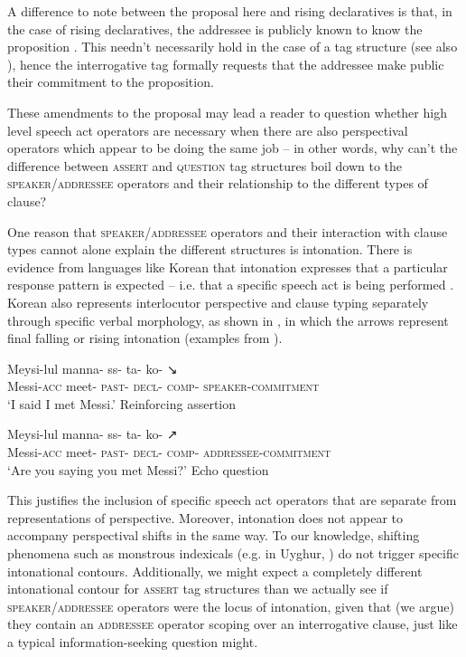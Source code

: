 \documentclass[output=paper,colorlinks,citecolor=brown]{langscibook}
\begin{document}
A difference to note between the proposal here and rising declaratives is that, in the case of rising declaratives, the addressee is publicly known to know the proposition \citep[84--85]{gunlogson2001}. This needn't necessarily hold in the case of a tag structure (see also \citealt{heppot2011}), hence the interrogative tag formally requests that the addressee make public their commitment to the proposition.

These amendments to the proposal may lead a reader to question whether high level speech act operators are necessary when there are also perspectival operators which appear to be doing the same job – in other words, why can't the difference between \textsc{assert} and \textsc{question} tag structures boil down to the \textsc{speaker}/\textsc{addressee} operators and their relationship to the different types of clause?

One reason that \textsc{speaker}/\textsc{addressee} operators and their interaction with clau\-se types cannot alone explain the different structures is intonation. There is evidence from languages like Korean that intonation expresses that a particular response pattern is expected – i.e. that a specific speech act is being performed \citep{ceong2019}. Korean also represents interlocutor perspective and clause typing separately through specific verbal morphology, as shown in , in which the arrows represent final falling or rising intonation (examples from \citealt[12--13]{ceong2017}).

\ea \label{koreanfall}
\gll Meysi-lul          manna-  ss-             ta-             ko-             ↘\\
     Messi-\textsc{acc} meet-   \textsc{past}-  \textsc{decl}-  \textsc{comp}-  \textsc{speaker-commitment}\\
\glt `I said I met Messi.' \phantom{a} \hfill Reinforcing assertion
\z
{} %

\ea \label{koreanrise}
\gll Meysi-lul          manna-  ss-             ta-             ko-            ↗\\
     Messi-\textsc{acc} meet-   \textsc{past}-  \textsc{decl}-  \textsc{comp}-  \textsc{addressee-commitment}\\
\glt `Are you saying you met Messi?' \phantom{a} \hfill Echo question 
\z
{} %

This justifies the inclusion of specific speech act operators that are separate from representations of perspective. Moreover, intonation does not appear to accompany perspectival shifts in the same way. To our knowledge, shifting phenomena such as monstrous indexicals (e.g. in Uyghur, \citealt{Shklovsky2014}) do not trigger specific intonational contours. Additionally, we might expect a completely different intonational contour for \textsc{assert} tag structures than we actually see if \textsc{speaker}/\textsc{ad\-dres\-see} operators were the locus of intonation, given that (we argue) they contain an \textsc{addressee} operator scoping over an interrogative clause, just like a typical information-seeking question might.
\end{document}
